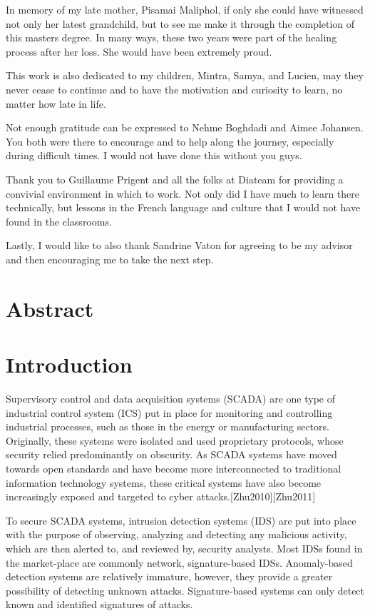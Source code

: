 \documentclass[12pt,]{article}
\begin{document}
In memory of my late mother, Pisamai Maliphol, if only she could have
witnessed not only her latest grandchild, but to see me make it through
the completion of this masters degree. In many ways, these two years
were part of the healing process after her loss. She would have been
extremely proud.

This work is also dedicated to my children, Mintra, Samya, and Lucien,
may they never cease to continue and to have the motivation and
curiosity to learn, no matter how late in life.

Not enough gratitude can be expressed to Nehme Boghdadi and Aimee
Johansen. You both were there to encourage and to help along the
journey, especially during difficult times. I would not have done this
without you guys.

Thank you to Guillaume Prigent and all the folks at Diateam for
providing a convivial environment in which to work. Not only did I have
much to learn there technically, but lessons in the French language and
culture that I would not have found in the classrooms.

Lastly, I would like to also thank Sandrine Vaton for agreeing to be my
advisor and then encouraging me to take the next step.

\pagebreak

\section*{Abstract}\label{abstract}

\pagebreak

\section{Introduction}\label{introduction}

Supervisory control and data acquisition systems (SCADA) are one type of
industrial control system (ICS) put in place for monitoring and
controlling industrial processes, such as those in the energy or
manufacturing sectors. Originally, these systems were isolated and used
proprietary protocols, whose security relied predominantly on obscurity.
As SCADA systems have moved towards open standards and have become more
interconnected to traditional information technology systems, these
critical systems have also become increasingly exposed and targeted to
cyber attacks.{[}Zhu2010{]}{[}Zhu2011{]}

To secure SCADA systems, intrusion detection systems (IDS) are put into
place with the purpose of observing, analyzing and detecting any
malicious activity, which are then alerted to, and reviewed by, security
analysts. Most IDSs found in the market-place are commonly network,
signature-based IDSs. Anomaly-based detection systems are relatively
immature, however, they provide a greater possibility of detecting
unknown attacks. Signature-based systems can only detect known and
identified signatures of attacks.
\end{document}
